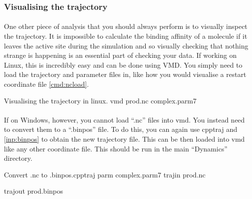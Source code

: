     \subsubsection{Visualising the trajectory}
    \paragraph{}
        One other piece of analysis that you should always perform is to visually inspect the trajectory. It is impossible to calculate the binding affinity of a molecule if it leaves the active site during the simulation and so visually checking that nothing strange is happening is an essential part of checking your data. If working on Linux, this is incredibly easy and can be done using VMD. You simply need to load the trajectory and parameter files in, like how you would visualise a restart coordinate file \cref{cmd:ncload}.

    \begin{bashcmd}[label=cmd:ncload]{Visualising the trajectory in linux.}
        vmd prod.nc complex.parm7
    \end{bashcmd}

    \paragraph{}
        If on Windows, however, you cannot load \enquote{.nc} files into vmd. You instead need to convert them to a \enquote{.binpos} file. To do this, you can again use cpptraj and \cref{inp:binpos} to obtain the new trajectory file. This can be then loaded into vmd like any other coordinate file. This should be run in the main \enquote{Dynamics} directory.

    \begin{inpfile}[label=inp:binpos]{Convert .nc to .binpos.}{cpptraj}
        parm complex.parm7
        trajin prod.nc

        trajout prod.binpos
    \end{inpfile}